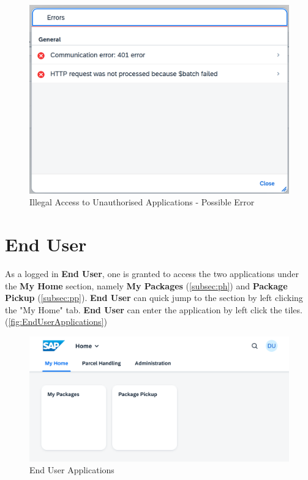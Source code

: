 \begin{figure}[H]
	\centering
	\includegraphics[width=0.5\linewidth]{images/user_doc/overviews/ConnectionError1.png}
	\caption{Illegal Access to Unauthorised Applications - Possible Error}
	\label{fig:IllegalAccesstoUnauthorised Applications}
\end{figure}

\pagebreak

\section{End User}
\label{sec:UdocEndUser}

As a logged in \textbf{End User}, one is granted to access the two applications under the \textbf{My Home} section, namely \textbf{My Packages} (\autoref{subsec:ph}) and \textbf{Package Pickup} (\autoref{subsec:pp}). \textbf{End User} can quick jump to the section by left clicking the "My Home" tab. \textbf{End User} can enter the application by left click the tiles. (\autoref{fig:EndUserApplications})

\begin{figure}[H]
	\centering
	\includegraphics[width=1\linewidth]{images/user_doc/overviews/MyHomeTab.png}
	\caption{End User Applications}
	\label{fig:EndUserApplications}
\end{figure}


% 

